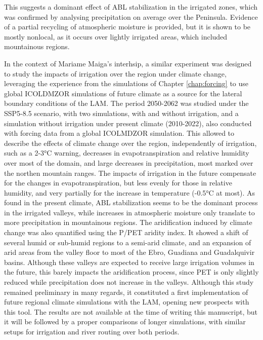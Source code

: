 This suggests a dominant effect of ABL stabilization in the irrigated zones, which was confirmed by analysing precipitation on average over the Peninsula. Evidence of a partial recycling of atmospheric moisture is provided, but it is shown to be mostly nonlocal, as it occurs over lightly irrigated areas, which included mountainous regions.

In the context of Mariame Maiga's interhsip, a similar experiment was designed to study the impacts of irrigation over the region under climate change, leveraging the experience from the simulations of Chapter \ref{chap:forcing} to use global ICOLDMZOR simulations of future climate as a source for the lateral boundary conditions of the LAM. The period 2050-2062 was studied under the SSP5-8.5 scenario, with two simulations, with and without irrigation, and a simulation without irrigation under present climate (2010-2022), also conducted with forcing data from a global ICOLMDZOR simulation.
This allowed to describe the effects of climate change over the region, independently of irrigation, such as a 2-3°C warning, decreases in evapotranspiration and relative humidity over most of the domain, and large decreases in precipitation, most marked over the northen mountain ranges. 
The impacts of irrigation in the future compensate for the changes in evapotranspiration, but less evenly for those in relative humidity, and very partially for the increase in temperature (-0.5°C at most). As found in the present climate, ABL stabilization seems to be the dominant process in the irrigated valleys, while increases in atmospheric moisture only translate to more precipitation in mountainous regions.
The aridification induced by climate change was also quantified using the P/PET aridity index.
It showed a shift of several humid or sub-humid regions to a semi-arid climate, and an expansion of arid areas from the valley floor to most of the Ebro, Guadiana and Guadalquivir basins. 
Although these valleys are expected to receive large irrigation volumes in the future, this barely impacts the aridification process, since PET is only slightly reduced while precipitation does not increase in the valleys.
Although this study remained preliminary in many regards, it constituted a first implementation of future regional climate simulations with the LAM, opening new prospects with this tool. The results are not available at the time of writing this manuscript, but it will be followed by a proper comparisons of longer simulations, with  similar setups for irrigation and river routing over both periods. %

